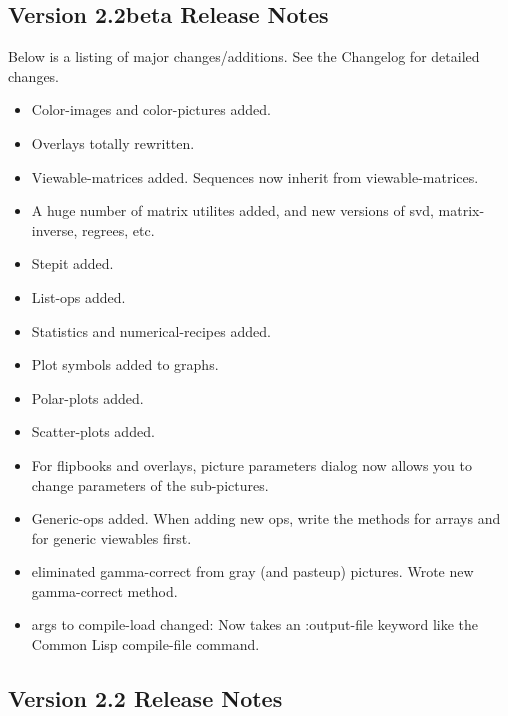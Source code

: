 \subsection{Version 2.2beta Release Notes}

Below is a listing of major changes/additions.  See the Changelog for
detailed changes.
\begin{itemize}
\item Color-images and color-pictures added.

\item Overlays totally rewritten.

\item Viewable-matrices added.  Sequences now inherit from
viewable-matrices. 

\item A huge number of matrix utilites added, and new versions of svd,
matrix-inverse, regrees, etc.

\item Stepit added.

\item List-ops added.

\item Statistics and numerical-recipes added.

\item Plot symbols added to graphs.

\item Polar-plots added.

\item Scatter-plots added.

\item For flipbooks and overlays, picture parameters dialog now allows
you to change parameters of the sub-pictures.

\item Generic-ops added.  When adding new ops, write the methods for
arrays and for generic viewables first.

\item eliminated gamma-correct from gray (and pasteup) pictures.
Wrote new gamma-correct method.

\item args to compile-load changed: Now  takes an :output-file keyword
like the Common Lisp compile-file command.

\end{itemize}


\subsection{Version 2.2 Release Notes}

